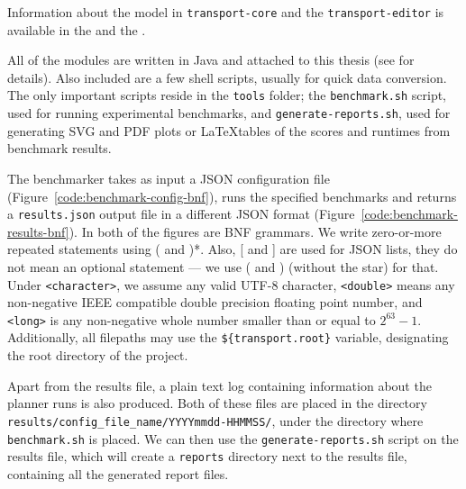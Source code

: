 Information about the model in \texttt{transport-core} and the \texttt{transport-editor} is available in the  and the .

All of the modules are written in Java and attached to this thesis (see  for details). Also included are a few shell scripts, usually for quick
data conversion. The only important scripts reside in the \texttt{tools} folder;
the \texttt{benchmark.sh} script, used for running experimental benchmarks,
and \texttt{generate-reports.sh}, used for generating SVG and PDF plots or \LaTeX tables of the scores and runtimes from benchmark results.

The benchmarker takes as input a JSON \citep{Bray2014} configuration file (Figure~\ref{code:benchmark-config-bnf}),
runs the specified benchmarks and returns a \texttt{results.json} output file in a different JSON format (Figure~\ref{code:benchmark-results-bnf}).
In both of the figures are BNF grammars. We write zero-or-more repeated statements using ( and )*. Also, [ and ] are used for JSON lists, they do not mean an optional statement --- we use ( and ) (without the star) for that.
Under \texttt{<character>}, we assume any valid UTF-8 character,
\texttt{<double>} means any non-negative IEEE compatible double precision floating point number,
and \texttt{<long>} is any non-negative whole number smaller than or equal to $2^{63}-1$.
Additionally, all filepaths may use the \verb+${transport.root}+ variable, designating the
root directory of the project.

Apart from the results file, a plain text log containing information about the planner
runs is also produced. Both of these files are placed in the directory \texttt{results/config\_file\_name/YYYYmmdd-HHMMSS/}, under the directory where \texttt{benchmark.sh} is placed.
We can then use the \texttt{generate-reports.sh} script on the results file,
which will create a \texttt{reports} directory next to the results file,
containing all the generated report files.

